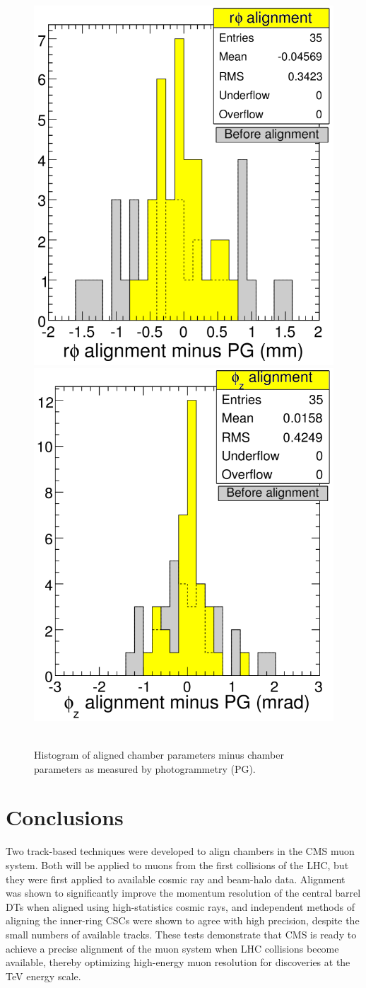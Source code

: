 \begin{figure}
\centering
\mbox{ } \hfill \includegraphics[width=0.35\linewidth]{data_rphi.eps} \hfill
\includegraphics[width=0.35\linewidth]{data_phiz.eps} \hfill \mbox{ }
\caption{Histogram of aligned chamber parameters minus chamber parameters as measured by photogrammetry (PG).} \label{data_accuracy}
\end{figure}

\section{Conclusions}

Two track-based techniques were developed to align chambers in the CMS
muon system.  Both will be applied to muons from the first collisions
of the LHC, but they were first applied to available cosmic ray and
beam-halo data.  Alignment was shown to significantly improve the
momentum resolution of the central barrel DTs when aligned using
high-statistics cosmic rays, and independent methods of aligning the
inner-ring CSCs were shown to agree with high precision, despite the small
numbers of available tracks.  These tests demonstrate that CMS is
ready to achieve a precise alignment of the muon system when LHC
collisions become available, thereby optimizing high-energy muon
resolution for discoveries at the TeV energy scale.

